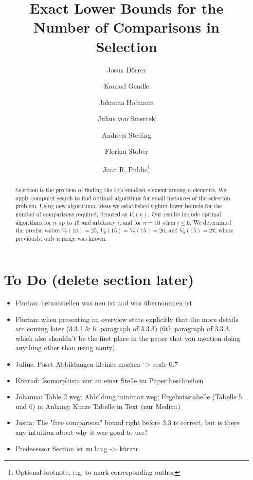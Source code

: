 \documentclass[a4paper,UKenglish,cleveref, autoref, thm-restate]{lipics-v2021}
\title{\Large Exact Lower Bounds for the Number of Comparisons in Selection}
\author{Josua Dörrer}{University Stuttgart}{}{}{}
\author{Konrad Gendle}{University Stuttgart}{}{}{}
\author{Johanna Hofmann}{University Stuttgart}{}{}{}
\author{Julius von Smercek}{University Stuttgart}{}{}{}
\author{Andreas Steding}{University Stuttgart}{}{}{}
\author{Florian Stober}{University Stuttgart}{}{}{}
\author{Joan R. Public\footnote{Optional footnote, e.g. to mark corresponding author}}{Department of Informatics, Dummy College, [optional: Address], Country}{joanrpublic@dummycollege.org}{[orcid]}{[funding]}
\begin{document}
\maketitle

\begin{abstract} \small\baselineskip=9pt
  Selection is the problem of finding the $i$-th smallest element among $n$ elements.
  We apply computer search to find optimal algorithms for small instances of the selection problem.
  Using new algorithmic ideas we established tighter lower bounds for the number of comparisons required, denoted as $V_i(n)$.
  Our results include optimal algorithms for $n$ up to 15 and arbitrary $i$, and for $n=16$ when $i \leq 6$.
  We determined the precise values $V_7(14) = 25$, $V_6(15) = V_7(15) = 26$, and $V_8(15) = 27$, where previously, only a range was known.

\end{abstract} %

\section*{To Do (delete section later)}
\begin{itemize}
  \item Florian: herausstellen was neu ist und was übernommen ist
  \item Florian: when presenting an overview state explicitly that the more details are coming later (3.3.1 \& 6. paragraph of 3.3.3) (6th paragraph of 3.3.3, which also shouldn't be the first place in the paper that you
  mention doing anything other than using nauty).
  \item Julius: Poset Abbildungen kleiner machen -> scale 0.7
  \item Konrad: Isomorphism nur an einer Stelle im Paper beschreiben
  \item Johanna: Table 2 weg; Abbildung minimax weg; Ergebnisstabelle (Tabelle 5 und 6) in Anhang; Kurze Tabelle in Text (nur Median)
  \item Josua: The "free comparison" bound right before 3.3 is correct, but is there
  any intuition about why it was good to use?
  \item Predecessor Section ist zu lang -> kürzer
\end{itemize}
\end{document}
